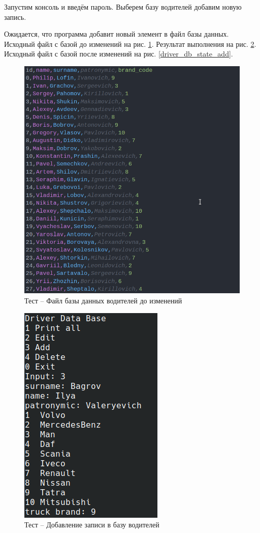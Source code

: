Запустим консоль и введём пароль. 
Выберем базу водителей добавим новую запись.

Ожидается, что программа добавит новый элемент в файл базы данных.
Исходный файл с базой до изменений на рис. \ref{driver_db_state_init2}.
Результат выполнения на рис. \ref{driver_db_add}.
Исходный файл с базой после изменений на рис. \ref{driver_db_state_add}.

\begin{figure}[H]
	\centering
	\includegraphics[width=0.7\linewidth]{photo/tests/admin/driver_db_state_init}
	\caption{Тест -- Файл базы данных водителей до изменений}
	\label{driver_db_state_init2}
\end{figure}

\begin{figure}[H]
	\centering
	\includegraphics[width=0.4\linewidth]{photo/tests/admin/driver_db_add}
	\caption{Тест -- Добавление записи в базу водителей}
	\label{driver_db_add}
\end{figure}

